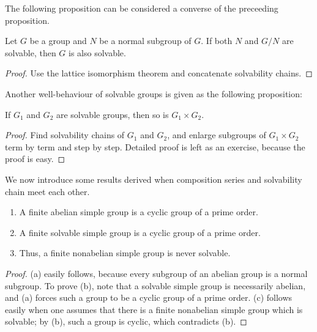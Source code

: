 The following proposition can be considered a converse of the preceeding proposition.
\begin{prop}
    Let $G$ be a group and $N$ be a normal subgroup of $G$.
    If both $N$ and $G/N$ are solvable, then $G$ is also solvable.
\end{prop}
\begin{proof}
    Use the lattice isomorphism theorem and concatenate solvability chains.
\end{proof}
Another well-behaviour of solvable groups is given as the following proposition:
\begin{prop}
    If $G_1$ and $G_2$ are solvable groups, then so is $G_1\times G_2$.
\end{prop}
\begin{proof}
    Find solvability chains of $G_1$ and $G_2$, and enlarge subgroups of $G_1\times G_2$ term by term and step by step. \color{brown}Detailed proof is left as an exercise, because the proof is easy.\color{black}
\end{proof}

We now introduce some results derived when composition series and solvability chain meet each other.
\begin{prop}
    \begin{enumerate}
        \item[(a)]
        {
            A finite abelian simple group is a cyclic group of a prime order.
        }
        \item[(b)]
        {
            A finite solvable simple group is a cyclic group of a prime order.
        }
        \item[(c)]
        {
            Thus, a finite nonabelian simple group is never solvable.
        }
    \end{enumerate}
\end{prop}
\begin{proof}
    (a) easily follows, because every subgroup of an abelian group is a normal subgroup.
    To prove (b), note that a solvable simple group is necessarily abelian, and (a) forces such a group to be a cyclic group of a prime order.
    (c) follows easily when one assumes that there is a finite nonabelian simple group which is solvable; by (b), such a group is cyclic, which contradicts (b).
\end{proof}

